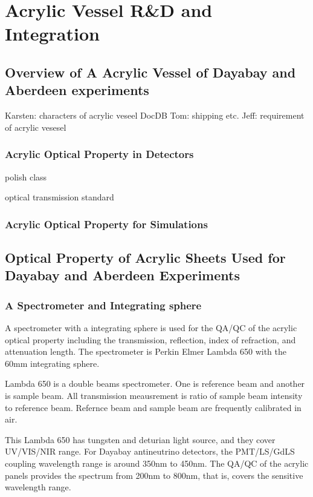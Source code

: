 \chapter {Acrylic Vessel R\&D and Integration}

\section {Overview of A Acrylic Vessel of Dayabay and Aberdeen experiments}

Karsten: characters of acrylic veseel DocDB
Tom: shipping etc.
Jeff: requirement of acrylic vesesel

\subsection {Acrylic Optical Property in Detectors}

polish class

optical transmission standard


\subsection {Acrylic Optical Property for Simulations}

\section {Optical Property of Acrylic Sheets Used for Dayabay and Aberdeen Experiments}

\subsection {A Spectrometer and Integrating sphere}

A spectrometer with a integrating sphere is used for the QA/QC
of the acrylic optical property including
the transmission, reflection, index of refraction, and attenuation length.
The spectrometer is Perkin Elmer Lambda 650 with the 60mm integrating sphere.

Lambda 650 is a double beams spectrometer. One is reference beam and another is
sample beam. All transmission meausrement is ratio of sample beam intensity to
reference beam. Refernce beam and sample beam are frequently calibrated in air.

This Lambda 650 has tungsten and deturian light source, and they cover UV/VIS/NIR
range. For Dayabay antineutrino detectors, the PMT/LS/GdLS coupling wavelength range
is around 350nm to 450nm. The QA/QC of the acrylic panels provides the spectrum
from 200nm to 800nm, that is, covers the sensitive wavelength range.


